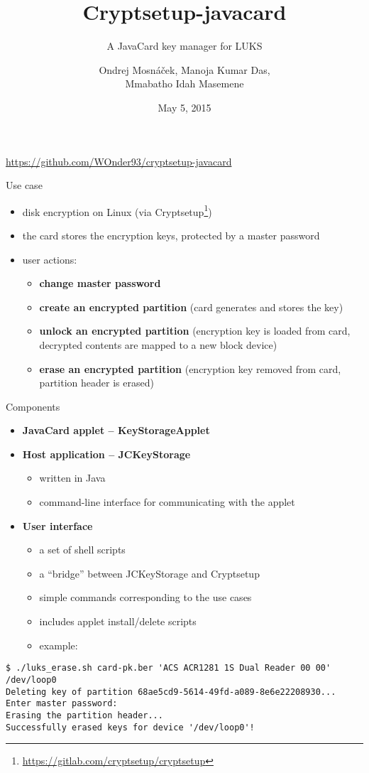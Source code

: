 \documentclass[12pt, t]{beamer}
\author{Ondrej Mosnáček, Manoja Kumar Das, \\Mmabatho Idah Masemene}
\title{Cryptsetup-javacard}
\subtitle{A JavaCard key manager for LUKS}
\institute{PV204 - Security Technologies}
\date{May 5, 2015}
\begin{document}
\begin{frame}
  \titlepage
  \begin{center}
    \url{https://github.com/WOnder93/cryptsetup-javacard}
  \end{center}
\end{frame}

\begin{frame}{Use case}
  \begin{itemize}
    \item disk encryption on Linux (via Cryptsetup\footnote{\url{https://gitlab.com/cryptsetup/cryptsetup}})
    \item the card stores the encryption keys, protected by a master password
    \item user actions:
    \begin{itemize}
      \item \textbf{change master password}
      \item \textbf{create an encrypted partition} (card generates and stores the key)
      \item \textbf{unlock an encrypted partition} (encryption key is loaded from card, decrypted contents are mapped to a new block device)
      \item \textbf{erase an encrypted partition} (encryption key removed from card, partition header is erased)
    \end{itemize}
  \end{itemize}
\end{frame}

\begin{frame}[fragile]{Components}
  \begin{itemize}
    \item \textbf{JavaCard applet -- KeyStorageApplet}
    \item \textbf{Host application -- JCKeyStorage}
    \begin{itemize}
      \item written in Java
      \item command-line interface for communicating with the applet
    \end{itemize}
    \item \textbf{User interface}
    \begin{itemize}
      \item a set of shell scripts
      \item a ``bridge'' between JCKeyStorage and Cryptsetup
      \item simple commands corresponding to the use cases
      \item includes applet install/delete scripts
      \item example:
    \end{itemize}
  \end{itemize}
  \scriptsize
  \begin{verbatim}
$ ./luks_erase.sh card-pk.ber 'ACS ACR1281 1S Dual Reader 00 00' /dev/loop0
Deleting key of partition 68ae5cd9-5614-49fd-a089-8e6e22208930...
Enter master password: 
Erasing the partition header...
Successfully erased keys for device '/dev/loop0'!
  \end{verbatim}
\end{frame}
\end{document}
